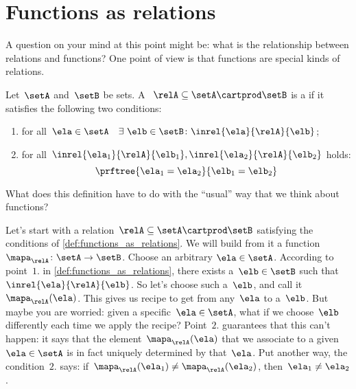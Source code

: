 
\section{Functions as relations}

A question on your mind at this point might be: what is the relationship between relations and functions?
One point of view is that functions are special kinds of relations.

\begin{definition}
    \label{def:functions_as_relations}
    Let~$\setA$ and~$\setB$ be sets.
    A ~$\relA \subseteq \setA \cartprod \setB$ is a \emph{} if it satisfies the following two conditions:
    \begin{enumerate}
        \item for all~$\ela \in \setA \quad \exists \ \elb \in \setB\colon  \inrel{\ela}{\relA}{\elb}$;
        \item for all~$\inrel{\ela_1}{\relA}{\elb_1}, \inrel{\ela_2}{\relA}{\elb_2}$ holds:
              \begin{equation*}
                  \prftree{\ela_1 = \ela_2}{\elb_1 = \elb_2}
              \end{equation*}
    \end{enumerate}
\end{definition}

What does this definition have to do with the ``usual'' way that we think about functions?

Let's start with a relation~$\relA \subseteq \setA \cartprod \setB$ satisfying the conditions of \cref{def:functions_as_relations}.
We will build from it a function~$\mapa_\relA \colon \setA \to \setB$.
Choose an arbitrary $\ela \in \setA$.
According to point~$1.$ in \cref{def:functions_as_relations}, there exists a~$\elb \in \setB$ such that~$\inrel{\ela}{\relA}{\elb}$.
So let's choose such a~$\elb$, and call it~$\mapa_\relA(\ela)$.
This gives us recipe to get from any~$\ela$ to a~$\elb$.
But maybe you are worried: given a specific~$\ela \in \setA$, what if we choose~$\elb$ differently each time we apply the recipe?
Point~$2.$ guarantees that this can't happen: it says that the element~$\mapa_\relA(\ela)$ that we associate to a given~$\ela \in \setA$ is in fact uniquely determined by that~$\ela$.
Put another way, the condition~$2.$ says: if~$\mapa_\relA(\ela_1) \neq \mapa_\relA(\ela_2)$, then~$\ela_1 \neq\ela_2$.


